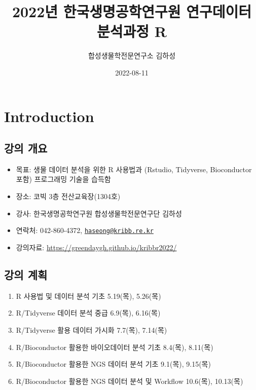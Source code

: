 \documentclass[
]{book}
\title{2022년 한국생명공학연구원 연구데이터 분석과정 R}
\author{합성생물학전문연구소 김하성}
\date{2022-08-11}
\providecommand{\tightlist}{%
  \setlength{\itemsep}{0pt}\setlength{\parskip}{0pt}}
\begin{document}
\maketitle

{
\setcounter{tocdepth}{1}
\tableofcontents
}
\hypertarget{introduction}{%
\chapter{Introduction}\label{introduction}}

\hypertarget{Information}{%
\section{강의 개요}\label{Information}}

\begin{itemize}
\tightlist
\item
  목표: 생물 데이터 분석을 위한 R 사용법과 (Rstudio, Tidyverse, Bioconductor 포함) 프로그래밍 기술을 습득함
\item
  장소: 코빅 3층 전산교육장(1304호)
\item
  강사: 한국생명공학연구원 합성생물학전문연구단 김하성
\item
  연락처: 042-860-4372, \href{mailto:haseong@kribb.re.kr}{\nolinkurl{haseong@kribb.re.kr}}
\item
  강의자료: \url{https://greendaygh.github.io/kribbr2022/}
\end{itemize}

\hypertarget{Schedule}{%
\section{강의 계획}\label{Schedule}}

\begin{enumerate}
\def\labelenumi{\arabic{enumi}.}
\tightlist
\item
  R 사용법 및 데이터 분석 기초 5.19(목), 5.26(목)
\item
  R/Tidyverse 데이터 분석 중급 6.9(목), 6.16(목)
\item
  R/Tidyverse 활용 데이터 가시화 7.7(목), 7.14(목)
\item
  R/Bioconductor 활용한 바이오데이터 분석 기초 8.4(목), 8.11(목)
\item
  R/Bioconductor 활용한 NGS 데이터 분석 기초 9.1(목), 9.15(목)
\item
  R/Bioconductor 활용한 NGS 데이터 분석 및 Workflow 10.6(목), 10.13(목)
\end{enumerate}
\end{document}

